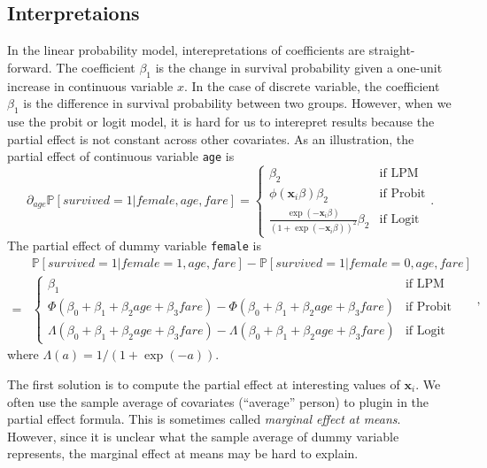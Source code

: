 \documentclass[
  12pt,
]{article}
\begin{document}
\hypertarget{interpretaions}{%
\subsection{Interpretaions}\label{interpretaions}}

In the linear probability model, interepretations of coefficients are
straight-forward. The coefficient \(\beta_1\) is the change in survival
probability given a one-unit increase in continuous variable \(x\). In
the case of discrete variable, the coefficient \(\beta_1\) is the
difference in survival probability between two groups. However, when we
use the probit or logit model, it is hard for us to interepret results
because the partial effect is not constant across other covariates. As
an illustration, the partial effect of continuous variable \texttt{age}
is \begin{equation*}
  \partial_{age} \mathbb{P}[survived = 1 | female, age, fare] =
  \begin{cases}
    \beta_2  &\text{if LPM}  \\
    \phi(\mathbf{x}_i \beta) \beta_2  &\text{if Probit}  \\
    \frac{\exp(-\mathbf{x}_i \beta)}{(1 + \exp(-\mathbf{x}_i \beta))^2} \beta_2 &\text{if Logit}
  \end{cases}.
\end{equation*} The partial effect of dummy variable \texttt{female} is
\begin{equation*}
  \begin{split}
  &\mathbb{P}[survived = 1 | female = 1, age, fare] - \mathbb{P}[survived = 1 | female = 0, age, fare] \\
  =& 
  \begin{cases}
    \beta_1 &\text{if LPM}  \\
    \Phi(\beta_0 + \beta_1 + \beta_2 age + \beta_3 fare) - \Phi(\beta_0 + \beta_1 + \beta_2 age + \beta_3 fare)  &\text{if Probit}  \\
    \Lambda(\beta_0 + \beta_1 + \beta_2 age + \beta_3 fare) - \Lambda(\beta_0 + \beta_1 + \beta_2 age + \beta_3 fare)  &\text{if Logit}
  \end{cases}
  \end{split},
\end{equation*} where \(\Lambda(a) = 1/(1 + \exp(-a))\).

The first solution is to compute the partial effect at interesting
values of \(\mathbf{x}_i\). We often use the sample average of
covariates (``average'' person) to plugin in the partial effect formula.
This is sometimes called \emph{marginal effect at means}. However, since
it is unclear what the sample average of dummy variable represents, the
marginal effect at means may be hard to explain.
\end{document}
